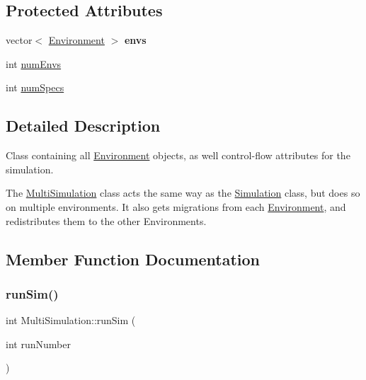 \subsection*{Protected Attributes}
\begin{DoxyCompactItemize}
\item 
\mbox{\label{classMultiSimulation_a1a63b241c79c535e6eca8708abd78ba9}} 
vector$<$ \hyperlink{classEnvironment}{Environment} $>$ {\bfseries envs}
\item 
int \hyperlink{classMultiSimulation_ac49cc927d6f96d4fda4ff010abc5041a}{num\+Envs}
\item 
int \hyperlink{classMultiSimulation_a383fa1e045cf0e1e7314708c89cb6312}{num\+Specs}
\end{DoxyCompactItemize}


\subsection{Detailed Description}
Class containing all \hyperlink{classEnvironment}{Environment} objects, as well control-\/flow attributes for the simulation. 

The \hyperlink{classMultiSimulation}{Multi\+Simulation} class acts the same way as the \hyperlink{classSimulation}{Simulation} class, but does so on multiple environments. It also gets migrations from each \hyperlink{classEnvironment}{Environment}, and redistributes them to the other Environments. 

\subsection{Member Function Documentation}
\mbox{\label{classMultiSimulation_a235347d04fd0c7e1a2e35d7a39e77583}} 
\subsubsection{\texorpdfstring{run\+Sim()}{runSim()}}
{\footnotesize\ttfamily int Multi\+Simulation\+::run\+Sim (\begin{DoxyParamCaption}\item[{int}]{run\+Number }\end{DoxyParamCaption})\hspace{0.3cm}{\ttfamily [virtual]}}



